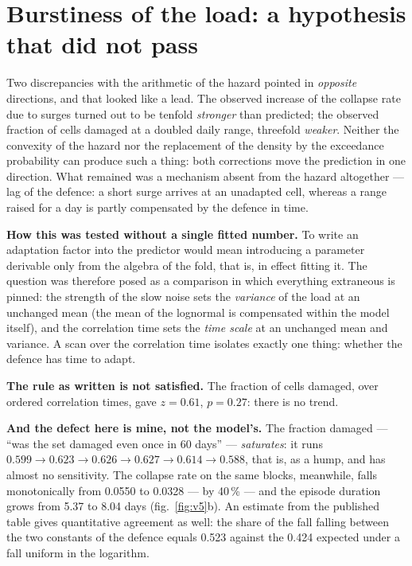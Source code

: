 \section{Burstiness of the load: a hypothesis that did not pass}\label{sec:burst}
Two discrepancies with the arithmetic of the hazard pointed in \emph{opposite} directions, and that looked like a lead. The observed increase of the collapse rate due to surges turned out to be tenfold \emph{stronger} than predicted; the observed fraction of cells damaged at a doubled daily range, threefold \emph{weaker}. Neither the convexity of the hazard nor the replacement of the density by the exceedance probability can produce such a thing: both corrections move the prediction in one direction. What remained was a mechanism absent from the hazard altogether --- lag of the defence: a short surge arrives at an unadapted cell, whereas a range raised for a day is partly compensated by the defence in time.

\textbf{How this was tested without a single fitted number.} To write an adaptation factor into the predictor would mean introducing a parameter derivable only from the algebra of the fold, that is, in effect fitting it. The question was therefore posed as a comparison in which everything extraneous is pinned: the strength of the slow noise sets the \emph{variance} of the load at an unchanged mean (the mean of the lognormal is compensated within the model itself), and the correlation time sets the \emph{time scale} at an unchanged mean and variance. A scan over the correlation time isolates exactly one thing: whether the defence has time to adapt.

\textbf{The rule as written is not satisfied.} The fraction of cells damaged, over ordered correlation times, gave $z=0.61$, $p=0.27$: there is no trend.

\textbf{And the defect here is mine, not the model's.} The fraction damaged --- ``was the set damaged even once in 60 days'' --- \emph{saturates}: it runs $0.599\to0.623\to0.626\to0.627\to0.614\to0.588$, that is, as a hump, and has almost no sensitivity. The collapse rate on the same blocks, meanwhile, falls monotonically from 0.0550 to 0.0328 --- by 40\,\% --- and the episode duration grows from 5.37 to 8.04 days (fig.~\ref{fig:v5}b). An estimate from the published table gives quantitative agreement as well: the share of the fall falling between the two constants of the defence equals 0.523 against the 0.424 expected under a fall uniform in the logarithm.


